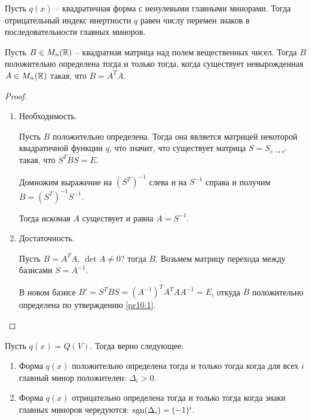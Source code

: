 \begin{corollary}
    Пусть $q(x)$ -- квадратичная форма с ненулевыми главными минорами. Тогда отрицательный индекс 
    инертности $q$ равен числу перемен знаков в последовательности главных миноров. 
\end{corollary}

\begin{lemma}
    \label{pr10.3}
    Пусть $B \in M_n(\mathbb{R})$ -- квадратная матрица над полем вещественных чисел. Тогда $B$ положительно 
    определена тогда и только тогда, когда существует невырожденная $A \in M_n(\mathbb{R})$ такая, что 
    $B = A^T A$.
\end{lemma}

\begin{proof}~
    \begin{enumerate}
        \item Необходимость.
        
        Пусть $B$ положительно определена. Тогда она является матрицей некоторой 
        квадратичной функции $q$, что значит, что существует матрица $S = S_{e \to e'}$ такая, что 
        $S^T B S = E$. 
        
        Домножим выражение на $(S^T)^{-1}$ слева и на $S^{-1}$ справа и получим $B = (S^T)^{-1} S^{-1}$.

        Тогда искомая $A$ существует и равна $A = S^{-1}$. 
        \item Достаточность.
        
        Пусть $B = A^T A$, $\det A \neq 0$? тогда $B$. Возьмем матрицу перехода между базисами $S = A^{-1}$. 

        В новом базисе $B' = S^TBS = (A^{-1})^T A^T A A^{-1} = E$, откуда $B$ положительно определена по 
        утверждению \ref{pr10.1}.
    \end{enumerate}
\end{proof}

\begin{theorem}
    Пусть $q(x) = Q(V)$. Тогда верно следующее:
    \begin{enumerate}
        \item Форма $q(x)$ положительно определена тогда и только тогда когда для всех $i$ главный минор 
        положителен: $\Delta_i > 0$.
        \item Форма $q(x)$ отрицательно определена тогда и только тогда когда знаки главных миноров чередуются:
        $\operatorname{sgn}(\Delta_i) = (-1)^i$.
    \end{enumerate}
\end{theorem}

